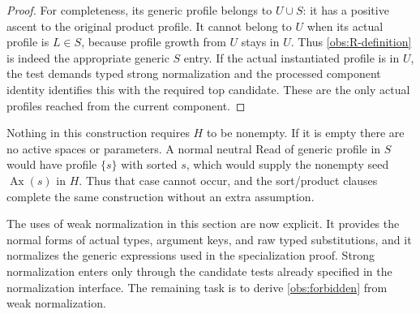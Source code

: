 \begin{proof}
For completeness, its generic profile belongs to $U\cup S$: it has a
positive ascent to the original product profile.  It cannot belong
to $U$ when its actual profile is $L\in S$, because profile growth
from $U$ stays in $U$.  Thus \eqref{obs:R-definition} is indeed the
appropriate generic $S$ entry.  If the actual instantiated profile is
in $U$, the test demands typed strong normalization and the processed
component identity identifies this with the required top candidate.
These are the only actual profiles reached from the current component.
\end{proof}

Nothing in this construction requires $H$ to be nonempty.  If it is
empty there are no active spaces or parameters.  A normal neutral Read
of generic profile in $S$ would have profile $\{s\}$ with sorted $s$,
which would supply the nonempty seed $\operatorname{Ax}(s)$ in $H$.
Thus that case cannot occur, and the sort/product clauses complete the
same construction without an extra assumption.

The uses of weak normalization in this section are now explicit.  It
provides the normal forms of actual types, argument keys, and raw typed
substitutions, and it normalizes the generic expressions used in the
specialization proof.  Strong normalization enters only through the
candidate tests already specified in the normalization interface.  The
remaining task is to derive \eqref{obs:forbidden} from weak normalization.
